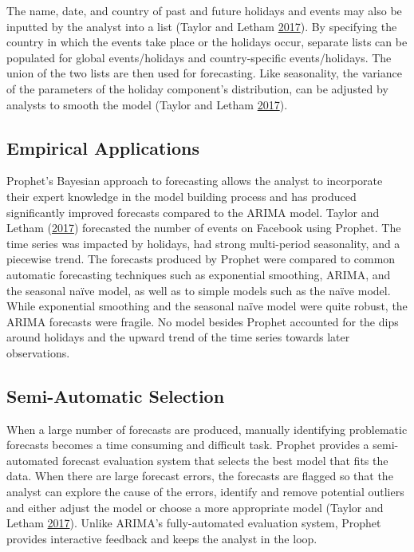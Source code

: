 \documentclass[12pt,preprint, authoryear]{elsarticle}
\numberwithin{equation}{section}
\numberwithin{figure}{section}
\numberwithin{table}{section}
\begin{document}
The name, date, and country of past and future holidays and events may
also be inputted by the analyst into a list (Taylor and Letham
\protect\hyperlink{ref-taylor2017}{2017}). By specifying the country in
which the events take place or the holidays occur, separate lists can be
populated for global events/holidays and country-specific
events/holidays. The union of the two lists are then used for
forecasting. Like seasonality, the variance of the parameters of the
holiday component's distribution, can be adjusted by analysts to smooth
the model (Taylor and Letham \protect\hyperlink{ref-taylor2017}{2017}).

\subsection{Empirical Applications}\label{empirical-applications-1}

Prophet's Bayesian approach to forecasting allows the analyst to
incorporate their expert knowledge in the model building process and has
produced significantly improved forecasts compared to the ARIMA model.
Taylor and Letham (\protect\hyperlink{ref-taylor2017}{2017}) forecasted
the number of events on Facebook using Prophet. The time series was
impacted by holidays, had strong multi-period seasonality, and a
piecewise trend. The forecasts produced by Prophet were compared to
common automatic forecasting techniques such as exponential smoothing,
ARIMA, and the seasonal naïve model, as well as to simple models such as
the naïve model. While exponential smoothing and the seasonal naïve
model were quite robust, the ARIMA forecasts were fragile. No model
besides Prophet accounted for the dips around holidays and the upward
trend of the time series towards later observations.

\subsection{Semi-Automatic Selection}\label{semi-automatic-selection}

When a large number of forecasts are produced, manually identifying
problematic forecasts becomes a time consuming and difficult task.
Prophet provides a semi-automated forecast evaluation system that
selects the best model that fits the data. When there are large forecast
errors, the forecasts are flagged so that the analyst can explore the
cause of the errors, identify and remove potential outliers and either
adjust the model or choose a more appropriate model (Taylor and Letham
\protect\hyperlink{ref-taylor2017}{2017}). Unlike ARIMA's
fully-automated evaluation system, Prophet provides interactive feedback
and keeps the analyst in the loop.
\end{document}
